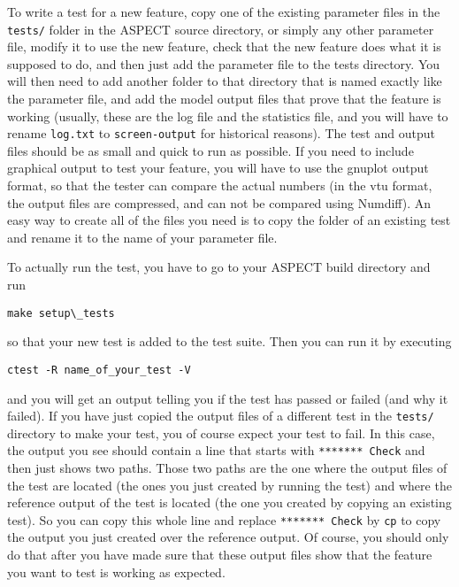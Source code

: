 \documentclass{article}
\newcommand{\aspect}{\textsc{ASPECT}}
\begin{document}
To write a test for a new feature, copy one of the existing parameter files in
the \texttt{tests/} folder in the \aspect{} source directory, or simply any other 
parameter file, modify it to use the new feature, check that the
new feature does what it is supposed to do, and then just add the parameter file to
the tests directory. You will then need to add another folder to that directory
that is named exactly like the parameter file, and add the model output files that
prove that the feature is working (usually, these are the log file and the statistics 
file, and you will have to rename \texttt{log.txt} to
\texttt{screen-output} for historical reasons). The test and output files should
be as small and quick to run as possible. If you need to include graphical output to 
test your feature, you will have to use the gnuplot output format, so that the tester 
can compare the actual numbers (in the vtu format, the output files are compressed, 
and can not be compared using Numdiff). 
An easy way to create all of the files you need is to copy the folder of an existing 
test and rename it to the name of your parameter file. 

To actually run the test, you have to go to your \aspect{} build directory and run 
\begin{lstlisting}[frame=single,language=ksh] 
    make setup\_tests
\end{lstlisting}
so that your new test is added to the test suite. Then you can run it by executing 
\begin{lstlisting}[frame=single,language=ksh] 
    ctest -R name_of_your_test -V
\end{lstlisting}
and you will get an output telling you if the test has 
passed or failed (and why it failed). If you have just copied the output files of a different 
test in the \texttt{tests/} directory to make your test, you of course expect your test to fail. 
In this case, the output you see should contain a line that starts with \texttt{******* Check} 
and then just shows two paths. Those two paths are the one where the output files of the test 
are located (the ones you just created by running the test) and where the reference output of the 
test is located (the one you created by copying an existing test). So you can copy this whole line
and replace \texttt{******* Check} by \texttt{cp} to copy the output you just created over the 
reference output. Of course, you should only do that after you have made sure that these output 
files show that the feature you want to test is working as expected. 
\end{document}
